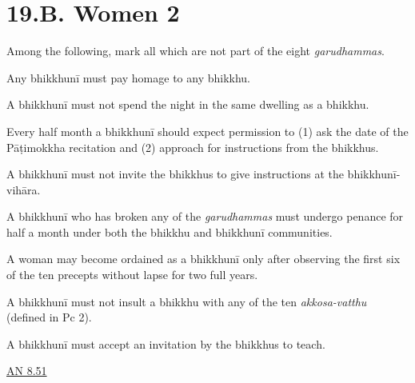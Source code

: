 \chapter{19.B. Women 2}
\renewcommand*{\theChapterTitle}{19.B. Women 2}

\begin{exam}{\autoExamName}


\begin{problem}
  Among the following, mark all which are not part of the eight \emph{garudhammas}.

  \begin{manswers}{1}
    \bChoices

     Any bhikkhunī must pay homage to any bhikkhu. \eAns

     A bhikkhunī must not spend the night in the same dwelling as a bhikkhu. \eAns

     Every half month a bhikkhunī should expect permission to (1) ask the date of the Pāṭimokkha recitation and (2) approach for instructions from the bhikkhus. \eAns

     A bhikkhunī must not invite the bhikkhus to give instructions at the bhikkhunī-vihāra. \eAns

     A bhikkhunī who has broken any of the \emph{garudhammas} must undergo penance for half a month under both the bhikkhu and bhikkhunī communities. \eAns

     A woman may become ordained as a bhikkhunī only after observing the first six of the ten precepts without lapse for two full years. \eAns

     A bhikkhunī must not insult a bhikkhu with any of the ten \emph{akkosa-vatthu} (defined in Pc 2). \eAns

     A bhikkhunī must accept an invitation by the bhikkhus to teach. \eAns

    \eChoices
  \end{manswers}

  \begin{solution}
    \href{https://suttacentral.net/an8.51/en/sujato}{AN 8.51}
  \end{solution}


\end{problem}
\end{exam}
